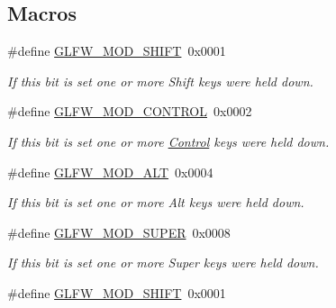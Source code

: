 \subsection*{Macros}
\begin{DoxyCompactItemize}
\item 
\mbox{\label{group__mods_ga14994d3196c290aaa347248e51740274}} 
\#define \hyperlink{group__mods_ga14994d3196c290aaa347248e51740274}{G\+L\+F\+W\+\_\+\+M\+O\+D\+\_\+\+S\+H\+I\+FT}~0x0001
\begin{DoxyCompactList}\small\item\em If this bit is set one or more Shift keys were held down. \end{DoxyCompactList}\item 
\mbox{\label{group__mods_ga6ed94871c3208eefd85713fa929d45aa}} 
\#define \hyperlink{group__mods_ga6ed94871c3208eefd85713fa929d45aa}{G\+L\+F\+W\+\_\+\+M\+O\+D\+\_\+\+C\+O\+N\+T\+R\+OL}~0x0002
\begin{DoxyCompactList}\small\item\em If this bit is set one or more \hyperlink{classControl}{Control} keys were held down. \end{DoxyCompactList}\item 
\mbox{\label{group__mods_gad2acd5633463c29e07008687ea73c0f4}} 
\#define \hyperlink{group__mods_gad2acd5633463c29e07008687ea73c0f4}{G\+L\+F\+W\+\_\+\+M\+O\+D\+\_\+\+A\+LT}~0x0004
\begin{DoxyCompactList}\small\item\em If this bit is set one or more Alt keys were held down. \end{DoxyCompactList}\item 
\mbox{\label{group__mods_ga6b64ba10ea0227cf6f42efd0a220aba1}} 
\#define \hyperlink{group__mods_ga6b64ba10ea0227cf6f42efd0a220aba1}{G\+L\+F\+W\+\_\+\+M\+O\+D\+\_\+\+S\+U\+P\+ER}~0x0008
\begin{DoxyCompactList}\small\item\em If this bit is set one or more Super keys were held down. \end{DoxyCompactList}\item 
\mbox{\label{group__mods_ga14994d3196c290aaa347248e51740274}} 
\#define \hyperlink{group__mods_ga14994d3196c290aaa347248e51740274}{G\+L\+F\+W\+\_\+\+M\+O\+D\+\_\+\+S\+H\+I\+FT}~0x0001

\end{DoxyCompactItemize}

